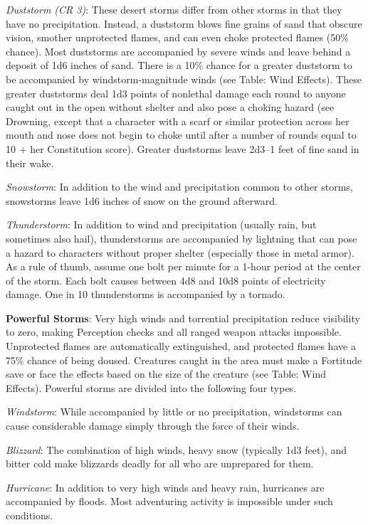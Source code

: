 \textit{Duststorm (CR 3)}: These desert storms differ from other storms in that they have no precipitation. Instead, a duststorm blows fine grains of sand that obscure vision, smother unprotected flames, and can even choke protected flames (50\% chance). Most duststorms are accompanied by severe winds and leave behind a deposit of 1d6 inches of sand. There is a 10\% chance for a greater duststorm to be accompanied by windstorm-magnitude winds (see Table: Wind Effects). These greater duststorms deal 1d3 points of nonlethal damage each round to anyone caught out in the open without shelter and also pose a choking hazard (see Drowning, except that a character with a scarf or similar protection across her mouth and nose does not begin to choke until after a number of rounds equal to 10 + her Constitution score). Greater duststorms leave 2d3--1 feet of fine sand in their wake.
				
\textit{Snowstorm}: In addition to the wind and precipitation common to other storms, snowstorms leave 1d6 inches of snow on the ground afterward. 
				
\textit{Thunderstorm}: In addition to wind and precipitation (usually rain, but sometimes also hail), thunderstorms are accompanied by lightning that can pose a hazard to characters without proper shelter (especially those in metal armor). As a rule of thumb, assume one bolt per minute for a 1-hour period at the center of the storm. Each bolt causes between 4d8 and 10d8 points of electricity damage. One in 10 thunderstorms is accompanied by a tornado. 
				
\textbf{Powerful Storms}: Very high winds and torrential precipitation reduce visibility to zero, making Perception checks and all ranged weapon attacks impossible. Unprotected flames are automatically extinguished, and protected flames have a 75\% chance of being doused. Creatures caught in the area must make a Fortitude save or face the effects based on the size of the creature (see Table: Wind Effects). Powerful storms are divided into the following four types.
				
\textit{Windstorm}: While accompanied by little or no precipitation, windstorms can cause considerable damage simply through the force of their winds.
				
\textit{Blizzard}: The combination of high winds, heavy snow (typically 1d3 feet), and bitter cold make blizzards deadly for all who are unprepared for them.
				
\textit{Hurricane}: In addition to very high winds and heavy rain, hurricanes are accompanied by floods. Most adventuring activity is impossible under such conditions.
				
